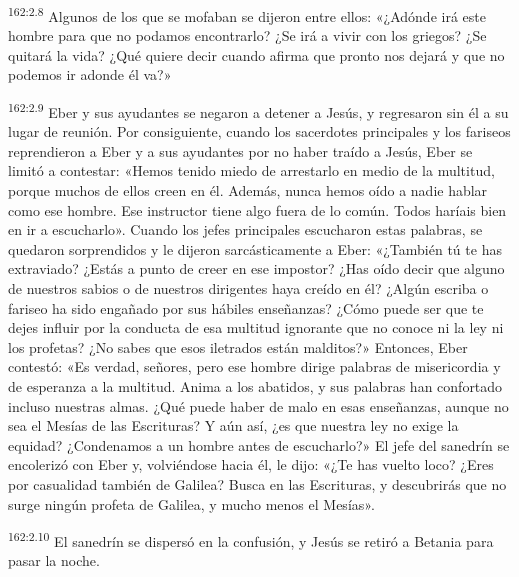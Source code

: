 \par 
\textsuperscript{162:2.8} Algunos de los que se mofaban se dijeron entre ellos: «¿Adónde irá este hombre para que no podamos encontrarlo? ¿Se irá a vivir con los griegos? ¿Se quitará la vida? ¿Qué quiere decir cuando afirma que pronto nos dejará y que no podemos ir adonde él va?»

\par 
\textsuperscript{162:2.9} Eber y sus ayudantes se negaron a detener a Jesús, y regresaron sin él a su lugar de reunión. Por consiguiente, cuando los sacerdotes principales y los fariseos reprendieron a Eber y a sus ayudantes por no haber traído a Jesús, Eber se limitó a contestar: «Hemos tenido miedo de arrestarlo en medio de la multitud, porque muchos de ellos creen en él. Además, nunca hemos oído a nadie hablar como ese hombre. Ese instructor tiene algo fuera de lo común. Todos haríais bien en ir a escucharlo». Cuando los jefes principales escucharon estas palabras, se quedaron sorprendidos y le dijeron sarcásticamente a Eber: «¿También tú te has extraviado? ¿Estás a punto de creer en ese impostor? ¿Has oído decir que alguno de nuestros sabios o de nuestros dirigentes haya creído en él? ¿Algún escriba o fariseo ha sido engañado por sus hábiles enseñanzas? ¿Cómo puede ser que te dejes influir por la conducta de esa multitud ignorante que no conoce ni la ley ni los profetas? ¿No sabes que esos iletrados están malditos?» Entonces, Eber contestó: «Es verdad, señores, pero ese hombre dirige palabras de misericordia y de esperanza a la multitud. Anima a los abatidos, y sus palabras han confortado incluso nuestras almas. ¿Qué puede haber de malo en esas enseñanzas, aunque no sea el Mesías de las Escrituras? Y aún así, ¿es que nuestra ley no exige la equidad? ¿Condenamos a un hombre antes de escucharlo?» El jefe del sanedrín se encolerizó con Eber y, volviéndose hacia él, le dijo: «¿Te has vuelto loco? ¿Eres por casualidad también de Galilea? Busca en las Escrituras, y descubrirás que no surge ningún profeta de Galilea, y mucho menos el Mesías».

\par 
\textsuperscript{162:2.10} El sanedrín se dispersó en la confusión, y Jesús se retiró a Betania para pasar la noche.

